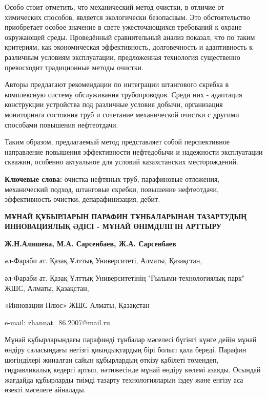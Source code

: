 Особо стоит отметить, что механический метод очистки, в отличие от
химических способов, является экологически безопасным. Это
обстоятельство приобретает особое значение в свете ужесточающихся
требований к охране окружающей среды. Проведённый сравнительный анализ
показал, что по таким критериям, как экономическая эффективность,
долговечность и адаптивность к различным условиям эксплуатации,
предложенная технология существенно превосходит традиционные методы
очистки.

Авторы предлагают рекомендации по интеграции штангового скребка в
комплексную систему обслуживания трубопроводов. Среди них - адаптация
конструкции устройства под различные условия добычи, организация
мониторинга состояния труб и сочетание механической очистки с другими
способами повышения нефтеотдачи.

Таким образом, предлагаемый метод представляет собой перспективное
направление повышения эффективности нефтедобычи и надежности
эксплуатации скважин, особенно актуальное для условий казахстанских
месторождений.

{\bfseries Ключевые слова:} очистка нефтяных труб, парафиновые отложения,
механический подход, штанговые скребки, повышение нефтеотдачи,
эффективность очистки, депарафинизация, дебит.

\begin{header}
{\bfseries МҰНАЙ ҚҰБЫРЛАРЫН ПАРАФИН ТҰНБАЛАРЫНАН ТАЗАРТУДЫҢ ИННОВАЦИЯЛЫҚ ӘДІСІ - МҰНАЙ ӨНІМДІЛІГІН АРТТЫРУ}

{\bfseries
{}Ж.Н.Алишева\envelope,
М.А. Сарсенбаев,
Ж.А. Сарсенбаев
}
\end{header}

\begin{affil}
әл-Фараби ат. Қазақ Ұлттық Университеті, Алматы, Қазақстан,

әл-Фараби ат. Қазақ Ұлттық Университетінің "Ғылыми-технологиялық парк" ЖШС, Алматы, Қазақстан,

«Инновации Плюс» ЖШС Алматы, Қазақстан

e-mail: zhannat\_86.2007@mail.ru
\end{affil}

Мұнай құбырларындағы парафинді тұнбалар мәселесі бүгінгі күнге дейін
мұнай өндіру саласындағы негізгі қиындықтардың бірі болып қала береді.
Парафин шөгінділері жиналған сайын құбырлардың өткізу қабілеті төмендеп,
гидравликалық кедергі артып, нәтижесінде мұнай өндіру көлемі азаяды.
Осындай жағдайда құбырларды тиімді тазарту технологияларын іздеу және
енгізу аса өзекті мәселеге айналады.

